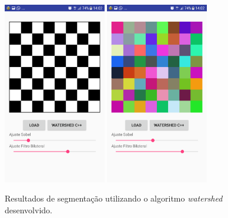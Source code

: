 \begin{figure}[!htb]
 \centering
 \def\baselinestretch{1}\small\normalsize
 \includegraphics[width=0.4\textwidth]{img/imagem_watershed_desenvolvido_app_n5.png}\qquad
 \includegraphics[width=0.4\textwidth]{img/resultado_watershed_desenvolvido_app_n5.png} 
 \caption{\label{fig:resultado_watershed_desenvolvido_app_p5}Resultados de segmentação utilizando o algoritmo \textit{watershed} desenvolvido.}
\end{figure}
